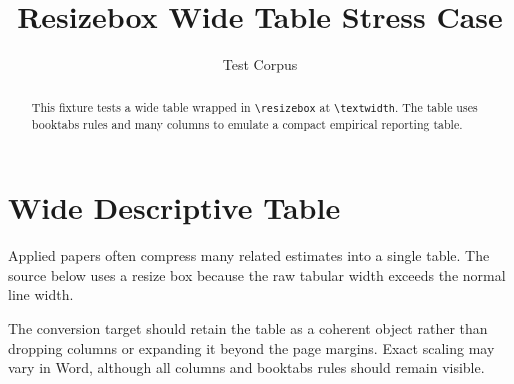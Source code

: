 \documentclass[11pt]{article}
\title{Resizebox Wide Table Stress Case}
\author{Test Corpus}
\date{}
\begin{document}
\maketitle

\begin{abstract}
This fixture tests a wide table wrapped in \texttt{\textbackslash resizebox} at
\texttt{\textbackslash textwidth}. The table uses booktabs rules and many columns
to emulate a compact empirical reporting table.
\end{abstract}

\section{Wide Descriptive Table}
\label{sec:wide-table}

Applied papers often compress many related estimates into a single table. The
source below uses a resize box because the raw tabular width exceeds the normal
line width.

\begin{table}[htbp]
\centering
\caption{Wide synthetic site-period summary}
\label{tab:wide-summary}
\end{table}

The conversion target should retain the table as a coherent object rather than
dropping columns or expanding it beyond the page margins. Exact scaling may vary
in Word, although all columns and booktabs rules should remain visible.
\end{document}
